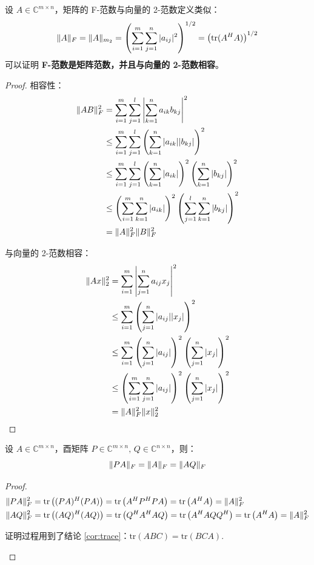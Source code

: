 \begin{definition}[Frobenius 范数]
设 $A\in\mathbb C^{m\times n}$，矩阵的 F-范数与向量的 2-范数定义类似：
\[
    \Vert A\Vert_{F}=\Vert A\Vert_{m_2}=\left(\sum_{i=1}^m\sum_{j=1}^n|a_{ij}|^2\right)^{1/2}=\left(\text{tr}(A^HA)\right)^{1/2}
\]
可以证明 \textbf{F-范数是矩阵范数，并且与向量的 2-范数相容}。
\end{definition}
\begin{proof}
相容性：
\begin{align*}
\Vert AB\Vert_F^2&=\sum_{i=1}^m\sum_{j=1}^l\left|\sum_{k=1}^na_{ik}b_{kj}\right|^2\\
&\leq\sum_{i=1}^m\sum_{j=1}^l\left(\sum_{k=1}^n|a_{ik}||b_{kj}|\right)^2\\
&\leq\sum_{i=1}^m\sum_{j=1}^l\left(\sum_{k=1}^n|a_{ik}|\right)^2\left(\sum_{k=1}^n|b_{kj}|\right)^2\\
&\leq\left(\sum_{i=1}^m\sum_{k=1}^n|a_{ik}|\right)^2\left(\sum_{j=1}^l\sum_{k=1}^n|b_{kj}|\right)^2\\
&=\Vert A\Vert_F^2\Vert B\Vert_F^2
\end{align*}

与向量的 2-范数相容：
\begin{align*}
\Vert Ax\Vert_2^2&=\sum_{i=1}^m\left|\sum_{j=1}^n a_{ij}x_j\right|^2\\
&\leq\sum_{i=1}^m\left(\sum_{j=1}^n |a_{ij}||x_j|\right)^2\\
&\leq\sum_{i=1}^m\left(\sum_{j=1}^n |a_{ij}|\right)^2\left(\sum_{j=1}^n|x_j|\right)^2\\
&\leq\left(\sum_{i=1}^m\sum_{j=1}^n |a_{ij}|\right)^2\left(\sum_{j=1}^n|x_j|\right)^2\\
&=\Vert A\Vert_F^2\Vert x\Vert_2^2
\end{align*}
\end{proof}

\begin{theorem}
设 $A\in\mathbb C^{m\times n}$，酉矩阵 $P\in\mathbb C^{m\times n},\,Q\in\mathbb C^{n\times n}$，则：
\[
    \Vert PA\Vert_F=\Vert A\Vert_F=\Vert AQ\Vert_F
\]
\end{theorem}
\begin{proof}
\begin{align*}
    &\Vert PA\Vert_F^2=\text{tr}\left((PA)^H(PA)\right)=\text{tr}\left(A^HP^HPA\right)=\text{tr}\left(A^HA\right)=\Vert A\Vert_F^2\\
    &\Vert AQ\Vert_F^2=\text{tr}\left((AQ)^H(AQ)\right)=\text{tr}\left(Q^HA^HAQ\right)=\text{tr}\left(A^HAQQ^H\right)=\text{tr}\left(A^HA\right)=\Vert A\Vert_F^2
\end{align*}
\begin{com}
证明过程用到了结论 \ref{cor:trace}：$\text{tr}(ABC)=\text{tr}(BCA)$.
\end{com}
\end{proof}

